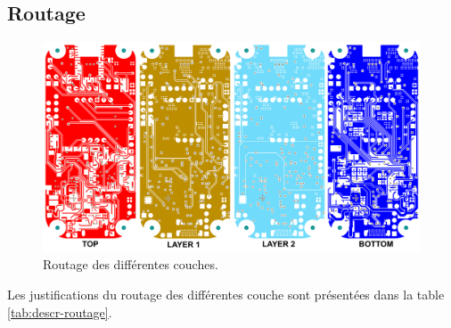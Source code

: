 \subsection{Routage} \label{ssec:routage}

\begin{figure}[!h]
	\centering
	\includegraphics[width=1\linewidth]{../figures/dev-pcb/Couches-layout}
	\caption{Routage des différentes couches.}
	\label{fig:couches-layout}
\end{figure}

Les justifications du routage des différentes couche sont présentées dans la table \ref{tab:descr-routage}.

